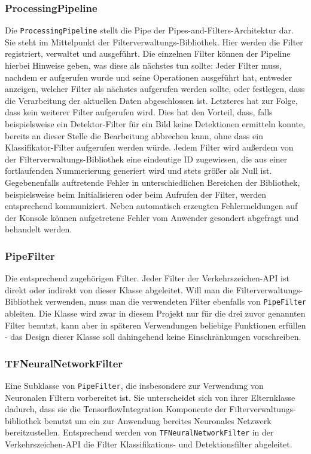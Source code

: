 \documentclass[12pt,a4paper,ngerman,enabledeprecatedfontcommands]{scrreprt}
\begin{document}
\subsubsection*{ProcessingPipeline}
Die \texttt{ProcessingPipeline} stellt  die Pipe der Pipes-and-Filters-Architektur dar. Sie steht im Mittelpunkt der \gls{Filterverwaltungs-Bibliothek}. Hier werden die Filter registriert, verwaltet und ausgeführt. 
Die einzelnen Filter können der Pipeline hierbei Hinweise geben, was diese als nächstes tun sollte:
Jeder Filter muss, nachdem er aufgerufen wurde und seine Operationen ausgeführt hat, entweder anzeigen, welcher Filter als nächstes aufgerufen werden sollte, oder festlegen, dass die Verarbeitung der aktuellen Daten abgeschlossen ist. Letzteres hat zur Folge, dass kein weiterer Filter aufgerufen wird. Dies hat den Vorteil, dass, falls beispielsweise ein Detektor-Filter für ein Bild keine Detektionen ermitteln konnte, bereits an dieser Stelle die Bearbeitung abbrechen kann, ohne dass ein Klassifikator-Filter aufgerufen werden würde.
Jedem Filter wird außerdem von der Filterverwaltungs-Bibliothek eine eindeutige ID zugewiesen, die aus einer fortlaufenden Nummerierung generiert wird und stets größer als Null ist. 
Gegebenenfalls auftretende Fehler in unterschiedlichen Bereichen der Bibliothek, beispielsweise beim Initialisieren oder beim Aufrufen der Filter, werden entsprechend kommuniziert. Neben automatisch erzeugten Fehlermeldungen auf der Konsole können aufgetretene Fehler vom Anwender gesondert abgefragt und behandelt werden.\\

\subsubsection*{PipeFilter}
Die entsprechend zugehörigen Filter. Jeder Filter der \gls{Verkehrszeichen-API} ist direkt oder indirekt von dieser Klasse abgeleitet. Will man die \gls{Filterverwaltungs-Bibliothek} verwenden, muss man die verwendeten Filter ebenfalls von \texttt{PipeFilter} ableiten. Die Klasse wird zwar in diesem Projekt nur für die drei zuvor genannten Filter benutzt, kann aber in späteren Verwendungen beliebige Funktionen erfüllen - das Design dieser Klasse soll dahingehend keine Einschränkungen vorschreiben.\\

\subsubsection*{TFNeuralNetworkFilter}
Eine Subklasse von \texttt{PipeFilter}, die insbesondere zur Verwendung von Neuronalen Filtern vorbereitet ist. Sie unterscheidet sich von ihrer Elternklasse dadurch, dass sie die TensorflowIntegration Komponente der Filterverwaltungs-bibliothek benutzt um ein zur Anwendung bereites \gls{Neuronales Netzwerk} bereitzustellen. Entsprechend werden von \texttt{TFNeuralNetworkFilter} in der \gls{Verkehrszeichen-API} die Filter Klassifikations- und Detektionsfilter abgeleitet.\\\\
\end{document}
